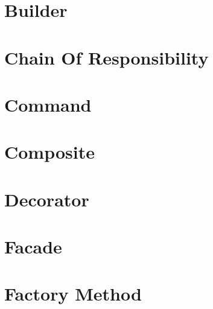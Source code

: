 \let\mypdfximage\pdfximage\def\pdfximage{\immediate\mypdfximage}\documentclass[twoside]{book}
\newcommand{\+}{\discretionary{\mbox{\scriptsize$\hookleftarrow$}}{}{}}
\begin{document}
\chapter{Builder}
\label{md__d_1__g_i_t__practice__design_patterns__builder__r_e_a_d_m_e}

\chapter{Chain Of Responsibility}
\label{md__d_1__g_i_t__practice__design_patterns__chain_of_responsibility__r_e_a_d_m_e}

\chapter{Command}
\label{md__d_1__g_i_t__practice__design_patterns__command__r_e_a_d_m_e}

\chapter{Composite}
\label{md__d_1__g_i_t__practice__design_patterns__composite__r_e_a_d_m_e}

\chapter{Decorator}
\label{md__d_1__g_i_t__practice__design_patterns__decorator__r_e_a_d_m_e}

\chapter{Facade}
\label{md__d_1__g_i_t__practice__design_patterns__facade__r_e_a_d_m_e}

\chapter{Factory Method}
\label{md__d_1__g_i_t__practice__design_patterns__factory_method__r_e_a_d_m_e}

\end{document}
